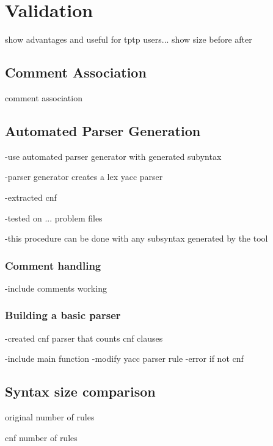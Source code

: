 
\chapter{Validation}\label{sec:Validation}
show advantages and useful for tptp users...
show size before after 
\section{Comment Association}\label{sec:ValidationCommentAssociation}
comment association


\section{Automated Parser Generation}\label{sec:ValidationAutomatedParserGeneration}
-use automated parser generator with generated subyntax

-parser generator creates a lex yacc parser

-extracted cnf





-tested on ... problem files


-this procedure can be done with any subsyntax generated by the tool

\subsection{Comment handling}\label{sec:ValidationAutomatedParserGenerationCommentHandling}
-include comments working
\subsection{Building a basic parser}\label{sec:ValidationAutomatedParserGenerationBuildingBasicParser}
-created cnf parser that counts cnf clauses

-include main function
-modify yacc parser rule
-error if not cnf
\section{Syntax size comparison}\label{sec:ValidationSyntaxSizeComparison}
original number of rules

cnf number of rules

